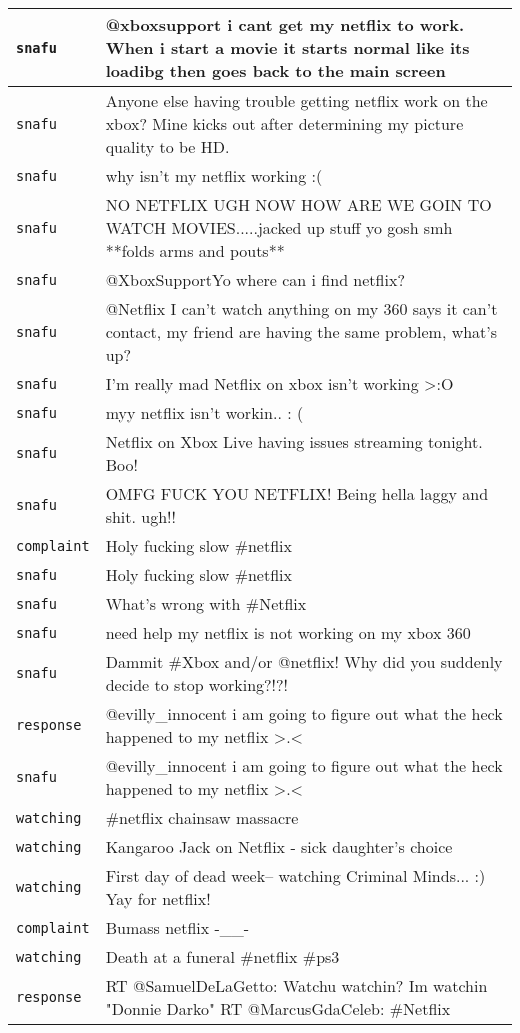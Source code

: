 \begin{center}
\begin{longtable}{|l|p{120mm}|}
      \tabularnewline\hline
         \texttt{snafu} & @xboxsupport i cant get my netflix to work. When i start a movie it starts normal like its loadibg then goes back to the main screen
      \tabularnewline\hline
         \texttt{snafu} & Anyone else having trouble getting netflix work on the xbox? Mine kicks out after determining my picture quality to be HD.
      \tabularnewline\hline
         \texttt{snafu} & why isn't my netflix working :(
      \tabularnewline\hline
         \texttt{snafu} & NO NETFLIX UGH NOW HOW ARE WE GOIN TO WATCH MOVIES.....jacked up stuff yo gosh smh **folds arms and pouts**
      \tabularnewline\hline
         \texttt{snafu} & @XboxSupportYo where can i find netflix?
      \tabularnewline\hline
         \texttt{snafu} & @Netflix I can't watch anything on my 360 says it can't contact, my friend are having the same problem, what's up?
      \tabularnewline\hline
         \texttt{snafu} & I'm really mad Netflix on xbox isn't working >:O
      \tabularnewline\hline
         \texttt{snafu} & myy netflix isn't workin.. : (
      \tabularnewline\hline
         \texttt{snafu} & Netflix on Xbox Live having issues streaming tonight. Boo!
      \tabularnewline\hline
         \texttt{snafu} & OMFG FUCK YOU NETFLIX! Being hella laggy and shit. ugh!!
      \tabularnewline\hline
         \texttt{complaint} & Holy fucking slow \#netflix
      \tabularnewline\hline
         \texttt{snafu} & Holy fucking slow \#netflix
      \tabularnewline\hline
         \texttt{snafu} & What's wrong with \#Netflix
      \tabularnewline\hline
         \texttt{snafu} & need help my netflix is not working on my xbox 360
      \tabularnewline\hline
         \texttt{snafu} & Dammit \#Xbox and/or @netflix! Why did you suddenly decide to stop working?!?!
      \tabularnewline\hline
         \texttt{response} & @evilly\_innocent i am going to figure out what the heck happened to my netflix >.<
      \tabularnewline\hline
         \texttt{snafu} & @evilly\_innocent i am going to figure out what the heck happened to my netflix >.<
      \tabularnewline\hline
         \texttt{watching} & \#netflix chainsaw massacre
      \tabularnewline\hline
         \texttt{watching} & Kangaroo Jack on Netflix - sick daughter's choice
      \tabularnewline\hline
         \texttt{watching} & First day of dead week-- watching Criminal Minds... :) Yay for netflix!
      \tabularnewline\hline
         \texttt{complaint} & Bumass netflix -\_\_-
      \tabularnewline\hline
         \texttt{watching} & Death at a funeral \#netflix \#ps3
      \tabularnewline\hline
         \texttt{response} & RT @SamuelDeLaGetto: Watchu watchin? Im watchin "Donnie Darko" RT @MarcusGdaCeleb: \#Netflix

\end{longtable}
\end{center}
